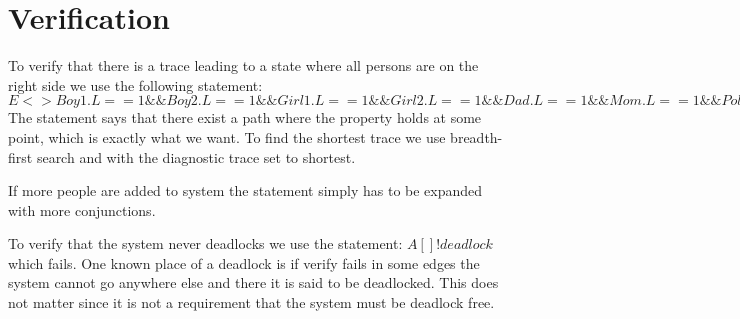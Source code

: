 \section{Verification}
To verify that there is a trace leading to a state where all persons are on the right side we use the following statement:
$E<> Boy1.L == 1 \&\& Boy2.L == 1 \&\& Girl1.L == 1 \&\& Girl2.L == 1 \&\& Dad.L == 1 \&\& Mom.L == 1 \&\& Police.L == 1 \&\& Thief.L == 1$
The statement says that there exist a path where the property holds at some point, which is exactly what we want. 
To find the shortest trace we use breadth-first search and with the diagnostic trace set to shortest. 

If more people are added to system the statement simply has to be expanded with more conjunctions. 

To verify that the system never deadlocks we use the statement:
$A[] !deadlock$ which fails. 
One known place of a deadlock is if verify fails in some edges the system cannot go anywhere else and there it is said to be deadlocked. 
This does not matter since it is not a requirement that the system must be deadlock free. 